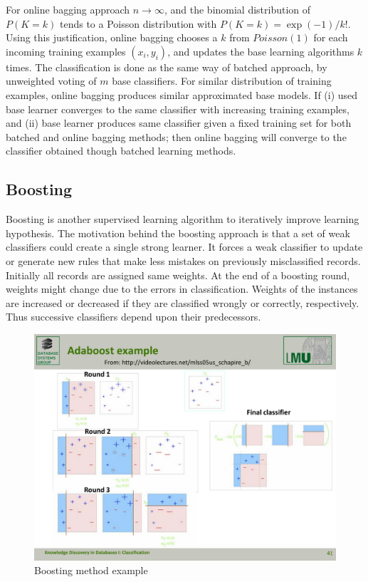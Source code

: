 For online bagging approach $n \rightarrow \infty$, and the binomial distribution of $P(K=k)$ tends to a Poisson distribution with $P(K=k) = \exp(-1)/k!$. Using this justification, online bagging chooses a $k $ from $Poisson(1)$ for each incoming training examples $(x_i, y_i)$, and updates the base learning algorithms $k$ times. The classification is done as the same way of batched approach, by unweighted voting of $m$ base classifiers. For similar distribution of training examples, online bagging produces similar approximated base models. If (i) used base learner converges to the same classifier with increasing training examples, and (ii) base learner produces same classifier given a fixed training set for both batched and online bagging methods; then online bagging will converge to the classifier obtained though batched learning methods.


\subsection{Boosting}
Boosting is another supervised learning algorithm to iteratively improve learning hypothesis. The motivation behind the boosting approach is that a set of weak classifiers could create a single strong learner. It forces a weak classifier to update or generate new rules that make less mistakes on previously misclassified records. Initially all records are assigned same weights. At the end of a boosting round, weights might change due to the errors in classification. Weights of the instances are increased or decreased if they are classified wrongly or correctly, respectively. Thus successive classifiers depend upon their predecessors. 
\begin{figure}[htbp]
    \begin{center}
        \includegraphics[width=12.0cm]{figs/boosting.pdf}
        \caption{Boosting method example}
        \label{fig:bg:bosting}
    \end{center}
\end{figure}


